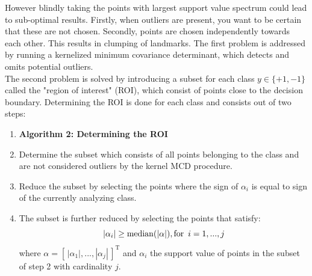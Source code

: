 \documentclass[preprint,12pt]{elsarticle}
\begin{document}
	However blindly taking the points with largest support value spectrum could lead to sub-optimal results. Firstly, when outliers are present, you want to be certain that these are not chosen. Secondly, points are chosen independently towards each other. This results in clumping of landmarks. The first problem is addressed by running a kernelized minimum covariance determinant, which detects and omits potential outliers.  \\
	
	The second problem is solved by introducing a subset for each class \newline $y \in \{+1,-1\}$ called the "region of interest" (ROI), which consist of points close to the decision boundary. Determining the ROI is done for each class and consists out of two steps:
	\begin{enumerate}
		\item[]\textbf{Algorithm 2: Determining the ROI}
		\item Determine the subset which consists of all points belonging to the class and are not considered outliers by the kernel MCD procedure.
		\item Reduce the subset by selecting the points where the sign of $\alpha_i$ is equal to sign of the currently analyzing class.
		\item The subset is further reduced by selecting the points that satisfy:
		\begin{equation}
			|\alpha_i| \geq \mathrm{median}(|\alpha|), \mathrm{for} \enskip i = 1,...,j
		\end{equation}
		 where $\alpha = [\,|\alpha_1|,...,|\alpha_j|\,]^{\mathrm{T}}$ and $\alpha_i$ the support value of points in the subset of step 2 with cardinality $j$.
	\end{enumerate}
\end{document}
